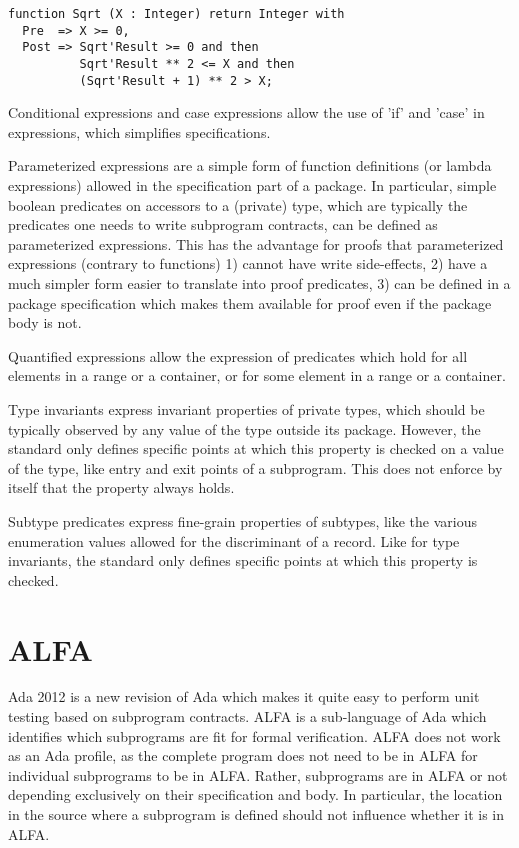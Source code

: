 \documentclass{article}
\begin{document}
\begin{verbatim}
function Sqrt (X : Integer) return Integer with
  Pre  => X >= 0,
  Post => Sqrt'Result >= 0 and then
          Sqrt'Result ** 2 <= X and then
          (Sqrt'Result + 1) ** 2 > X;
\end{verbatim}

Conditional expressions and case expressions allow the use of 'if' and 'case'
in expressions, which simplifies specifications.

Parameterized expressions are a simple form of function definitions (or lambda
expressions) allowed in the specification part of a package. In particular,
simple boolean predicates on accessors to a (private) type, which are typically
the predicates one needs to write subprogram contracts, can be defined as
parameterized expressions. This has the advantage for proofs that parameterized
expressions (contrary to functions) 1) cannot have write side-effects, 2) have
a much simpler form easier to translate into proof predicates, 3) can be
defined in a package specification which makes them available for proof even if
the package body is not.

Quantified expressions allow the expression of predicates which hold for all
elements in a range or a container, or for some element in a range or a
container.

Type invariants express invariant properties of private types, which should be
typically observed by any value of the type outside its package. However, the
standard only defines specific points at which this property is checked on a
value of the type, like entry and exit points of a subprogram. This does not
enforce by itself that the property always holds.

Subtype predicates express fine-grain properties of subtypes, like the various
enumeration values allowed for the discriminant of a record. Like for type
invariants, the standard only defines specific points at which this property is
checked.

\section{ALFA}

Ada 2012 is a new revision of Ada which makes it quite easy to perform unit
testing based on subprogram contracts. ALFA is a sub-language of Ada which
identifies which subprograms are fit for formal verification. ALFA does not
work as an Ada profile, as the complete program does not need to be in ALFA for
individual subprograms to be in ALFA. Rather, subprograms are in ALFA or not
depending exclusively on their specification and body. In particular, the
location in the source where a subprogram is defined should not influence
whether it is in ALFA.
\end{document}
